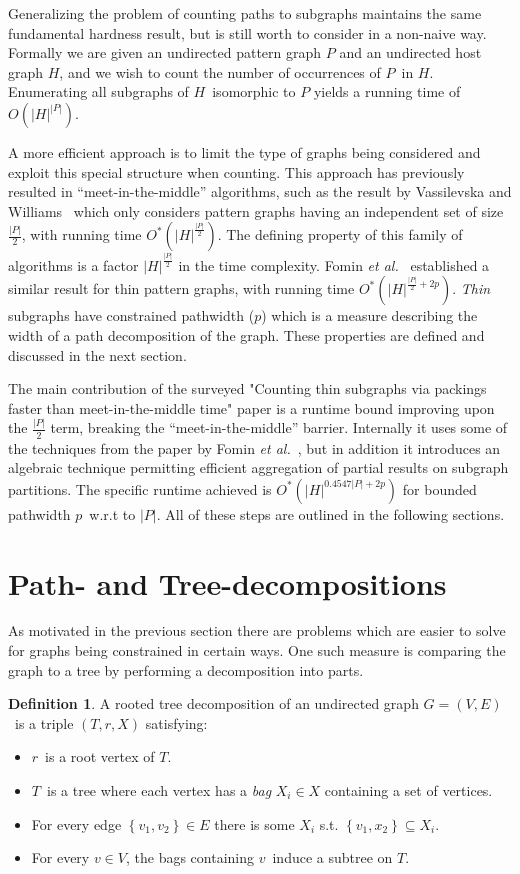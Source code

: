 \documentclass[a4paper,11pt]{report}
\theoremstyle{plain}
\theoremstyle{definition}
\newtheorem{defn}[thm]{Definition} %
\begin{document}
Generalizing the problem of counting paths to subgraphs maintains the same fundamental hardness result, but is still worth to consider in a non-naive way.
Formally we are given an undirected pattern graph $P$ and an undirected host graph $H$, and we wish to count the number of occurrences of $P$ in $H$.
Enumerating all subgraphs of $H$ isomorphic to $P$ yields a running time of $O(|H|^{|P|})$.

A more efficient approach is to limit the type of graphs being considered and exploit this special structure when counting.
This approach has previously resulted in ``meet-in-the-middle'' algorithms, such as the result by Vassilevska and Williams~\cite{VW09} which only considers pattern graphs having an independent set of size $\frac{|P|}{2}$,
with running time $O^*(|H|^{\frac{|P|}{2}})$.
The defining property of this family of algorithms is a factor $|H|^{\frac{|P|}{2}}$ in the time complexity.
Fomin \emph{et al.}~\cite{FLRRS12} established a similar result for thin pattern graphs, with running time $O^*(|H|^{\frac{|P|}{2} + 2p})$.
\emph{Thin} subgraphs have constrained pathwidth ($p$) which is a measure describing the width of a path decomposition of the graph.
These properties are defined and discussed in the next section.

The main contribution of the surveyed "Counting thin subgraphs via packings faster than meet-in-the-middle time" paper \cite{BHKK13} is a runtime bound improving upon the $\frac{|P|}{2}$ term, breaking the ``meet-in-the-middle'' barrier.
Internally it uses some of the techniques from the paper by Fomin \emph{et al.}~\cite{FLRRS12},
but in addition it introduces an algebraic technique permitting efficient aggregation of partial results on subgraph partitions.
The specific runtime achieved is $O^*(|H|^{0.4547|P| + 2p})$ for bounded pathwidth $p$ w.r.t to $|P|$.
All of these steps are outlined in the following sections.


\section{Path- and Tree-decompositions}
As motivated in the previous section there are problems which are easier to solve for graphs being constrained in certain ways.
One such measure is comparing the graph to a tree by performing a decomposition into parts.

\begin{defn}
A rooted tree decomposition of an undirected graph $G = (V, E)$ is a triple $(T, r, X)$ satisfying:
\begin{itemize}
\item $r$ is a root vertex of $T$.
\item $T$ is a tree where each vertex has a \emph{bag} $X_i \in X$ containing a set of vertices.
\item For every edge $\left\{v_1, v_2\right\} \in E$ there is some $X_i$ s.t. $\left\{v_1, x_2\right\} \subseteq X_i$.
\item For every $v \in V$, the bags containing $v$ induce a subtree on $T$.
\end{itemize}
\end{defn}
\end{document}
